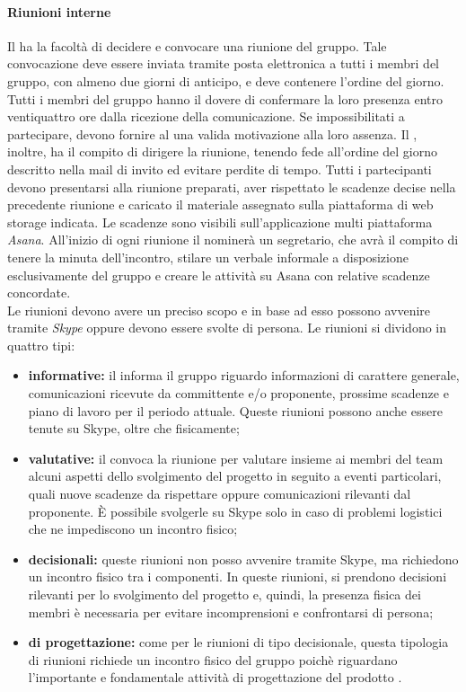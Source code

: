 			\paragraph{Riunioni interne}
			Il \textit{\RdP} ha la facoltà di decidere e convocare una riunione del gruppo. Tale convocazione deve essere inviata tramite posta elettronica a tutti i membri del gruppo, con almeno due giorni di anticipo, e deve contenere l'ordine del giorno. Tutti i membri del gruppo hanno il dovere di confermare la loro presenza entro ventiquattro ore dalla ricezione della comunicazione. Se impossibilitati a partecipare, devono fornire al \textit{\RdP} una valida motivazione alla loro assenza. Il \textit{\RdP}, inoltre, ha il compito di dirigere la riunione, tenendo fede all'ordine del giorno descritto nella mail di invito ed evitare perdite di tempo. Tutti i partecipanti devono presentarsi alla riunione preparati, aver rispettato le scadenze decise nella precedente riunione e caricato il materiale assegnato sulla piattaforma di web storage indicata. Le scadenze sono visibili sull'applicazione multi piattaforma \textit{Asana}.
			All’inizio di ogni riunione il \textit{\RdP} nominerà un segretario, che avrà il compito di tenere la minuta dell'incontro, stilare un verbale informale a disposizione esclusivamente del gruppo e creare le attività su Asana con relative scadenze concordate.\\
			Le riunioni devono avere un preciso scopo e in base ad esso possono avvenire tramite \textit{Skype} oppure devono essere svolte di persona. Le riunioni si dividono in quattro tipi:
			\begin{itemize}
				\item \textbf{informative:} il \textit{\RdP} informa il gruppo riguardo informazioni di carattere generale, comunicazioni ricevute da committente e/o proponente, prossime scadenze e piano di lavoro per il periodo attuale. Queste riunioni possono anche essere tenute su Skype, oltre che fisicamente;
				\item \textbf{valutative:} il \textit{\RdP} convoca la riunione per valutare insieme ai membri del team alcuni aspetti dello svolgimento del progetto in seguito a eventi particolari, quali nuove scadenze da rispettare oppure comunicazioni rilevanti dal proponente. \MakeUppercase{è} possibile svolgerle su Skype solo in caso di problemi logistici che ne impediscono un incontro fisico;
				\item \textbf{decisionali:} queste riunioni non posso avvenire tramite Skype, ma richiedono un incontro fisico tra i componenti. In queste riunioni, si prendono decisioni rilevanti per lo svolgimento del progetto e, quindi, la presenza fisica dei membri è necessaria per evitare incomprensioni e confrontarsi di persona;
				\item \textbf{di progettazione:} come per le riunioni di tipo decisionale, questa tipologia di riunioni richiede un incontro fisico del gruppo poichè riguardano l'importante e fondamentale attività di progettazione del prodotto \progetto. 
			\end{itemize}
			
